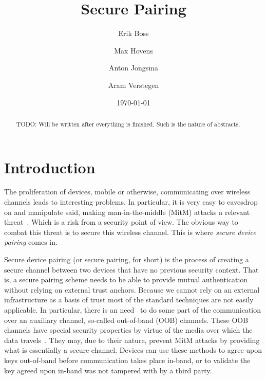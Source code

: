\documentclass[conference, 11pt]{sty/IEEEtran}
\title{Secure Pairing}
\author{Erik Boss \and Max Hovens \and Anton Jongsma \and Aram Verstegen}
\date{\today}
\begin{document}
\maketitle

\begin{abstract}
    TODO: Will be written after everything is finished. Such is the nature of abstracts.
\end{abstract}

\section{Introduction}
\label{sec:introduction}

The proliferation of devices, mobile or otherwise, communicating over wireless channels leads to interesting problems.
In particular, it is very easy to eavesdrop on and manipulate said, making man-in-the-middle (MitM) attacks a relevant threat~\cite{kumar2009comparative}.
Which is a risk from a security point of view.
The obvious way to combat this threat is to secure this wireless channel.
This is where \emph{secure device pairing} comes in.

Secure device pairing (or secure pairing, for short) is the process of creating a secure channel between two devices that have no previous security context.
That is, a secure pairing scheme needs to be able to provide mutual authentication without relying on external trust anchors.
Because we cannot rely on an external infrastructure as a basis of trust most of the standard techniques are not easily applicable.
In particular, there is an need~\cite{kumar2009comparative} to do some part of the communication over an auxiliary channel, so-called out-of-band (OOB) channels.
These OOB channels have special security properties by virtue of the media over which the data travels~\cite{balfanz2002talking}.
They may, due to their nature, prevent MitM attacks by providing what is essentially a secure channel.
Devices can use these methods to agree upon keys out-of-band before communication takes place in-band, or to validate the key agreed upon in-band was not tampered with by a third party.
\end{document}
